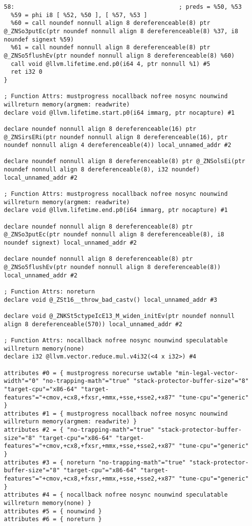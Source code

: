 \documentclass[UTF8,a4paper,10pt]{ctexart}
\begin{document}
\begin{lstlisting}[title=O2优化,frame=trbl]
58:                                               ; preds = %50, %53
  %59 = phi i8 [ %52, %50 ], [ %57, %53 ]
  %60 = call noundef nonnull align 8 dereferenceable(8) ptr @_ZNSo3putEc(ptr noundef nonnull align 8 dereferenceable(8) %37, i8 noundef signext %59)
  %61 = call noundef nonnull align 8 dereferenceable(8) ptr @_ZNSo5flushEv(ptr noundef nonnull align 8 dereferenceable(8) %60)
  call void @llvm.lifetime.end.p0(i64 4, ptr nonnull %1) #5
  ret i32 0
}

; Function Attrs: mustprogress nocallback nofree nosync nounwind willreturn memory(argmem: readwrite)
declare void @llvm.lifetime.start.p0(i64 immarg, ptr nocapture) #1

declare noundef nonnull align 8 dereferenceable(16) ptr @_ZNSirsERi(ptr noundef nonnull align 8 dereferenceable(16), ptr noundef nonnull align 4 dereferenceable(4)) local_unnamed_addr #2

declare noundef nonnull align 8 dereferenceable(8) ptr @_ZNSolsEi(ptr noundef nonnull align 8 dereferenceable(8), i32 noundef) local_unnamed_addr #2

; Function Attrs: mustprogress nocallback nofree nosync nounwind willreturn memory(argmem: readwrite)
declare void @llvm.lifetime.end.p0(i64 immarg, ptr nocapture) #1

declare noundef nonnull align 8 dereferenceable(8) ptr @_ZNSo3putEc(ptr noundef nonnull align 8 dereferenceable(8), i8 noundef signext) local_unnamed_addr #2

declare noundef nonnull align 8 dereferenceable(8) ptr @_ZNSo5flushEv(ptr noundef nonnull align 8 dereferenceable(8)) local_unnamed_addr #2

; Function Attrs: noreturn
declare void @_ZSt16__throw_bad_castv() local_unnamed_addr #3

declare void @_ZNKSt5ctypeIcE13_M_widen_initEv(ptr noundef nonnull align 8 dereferenceable(570)) local_unnamed_addr #2

; Function Attrs: nocallback nofree nosync nounwind speculatable willreturn memory(none)
declare i32 @llvm.vector.reduce.mul.v4i32(<4 x i32>) #4

attributes #0 = { mustprogress norecurse uwtable "min-legal-vector-width"="0" "no-trapping-math"="true" "stack-protector-buffer-size"="8" "target-cpu"="x86-64" "target-features"="+cmov,+cx8,+fxsr,+mmx,+sse,+sse2,+x87" "tune-cpu"="generic" }
attributes #1 = { mustprogress nocallback nofree nosync nounwind willreturn memory(argmem: readwrite) }
attributes #2 = { "no-trapping-math"="true" "stack-protector-buffer-size"="8" "target-cpu"="x86-64" "target-features"="+cmov,+cx8,+fxsr,+mmx,+sse,+sse2,+x87" "tune-cpu"="generic" }
attributes #3 = { noreturn "no-trapping-math"="true" "stack-protector-buffer-size"="8" "target-cpu"="x86-64" "target-features"="+cmov,+cx8,+fxsr,+mmx,+sse,+sse2,+x87" "tune-cpu"="generic" }
attributes #4 = { nocallback nofree nosync nounwind speculatable willreturn memory(none) }
attributes #5 = { nounwind }
attributes #6 = { noreturn }


\end{lstlisting}
\end{document}
